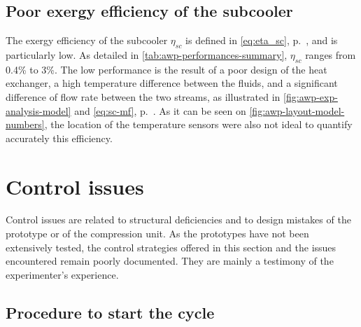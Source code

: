 \subsection{Poor exergy efficiency of the subcooler}
\label{sec:awp-low-etaII-sc}

The exergy efficiency of the subcooler $\eta_{sc}$ is defined in
\cref{eq:eta_sc}, p.~\pageref{eq:eta_sc}, and is particularly low. As
detailed in \cref{tab:awp-performances-summary}, $\eta_{sc}$ ranges
from 0.4\% to 3\%. The low performance is the result of a poor
design of the heat exchanger, a high temperature
difference between the fluids, and a significant difference of flow
rate between the two streams, as illustrated in
\cref{fig:awp-exp-analysis-model} and \cref{eq:sc-mf},
p.~\pageref{eq:sc-mf}. As it can be seen on
\cref{fig:awp-layout-model-numbers}, the location of the temperature
sensors were also not ideal to quantify accurately this efficiency.

\section{Control issues}
\label{sec:awp-control-issues}

Control issues are related to structural deficiencies and to design
mistakes of the prototype or of the compression unit. As the
prototypes have not been extensively tested, the control strategies
offered in this section and the issues encountered remain poorly
documented. They are mainly a testimony of the experimenter's
experience.

\subsection{Procedure to start the cycle}
\label{sec:awp-proc-start}


